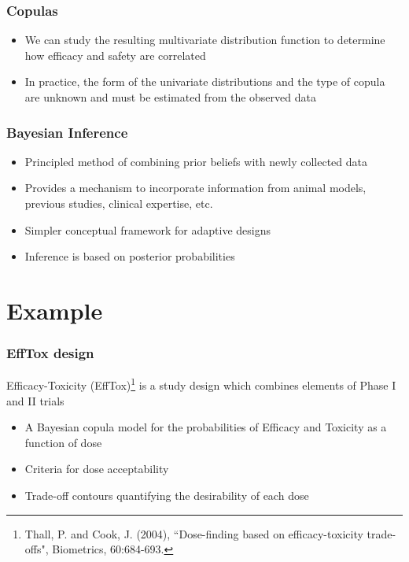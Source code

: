 \documentclass{beamer}
\begin{document}
	\begin{frame}
		\frametitle{Copulas}
		\begin{itemize}
		\setlength\itemsep{2em}
		\item We can study the resulting multivariate distribution function to determine how efficacy and safety are correlated
		\item In practice, the form of the univariate distributions and the type of copula are unknown and must be estimated from the observed data
		\end{itemize}
	\end{frame}
		
	\begin{frame}
		\frametitle{Bayesian Inference}
		\begin{itemize}
			\setlength\itemsep{2em}
			\item Principled method of combining prior beliefs with newly collected data 
			\item Provides a mechanism to incorporate information from animal models, previous studies, clinical expertise, etc.
			\item Simpler conceptual framework for adaptive designs
			\item Inference is based on posterior probabilities
		\end{itemize}
	\end{frame}	

	
\section{Example}
	
	\begin{frame}
		\frametitle{EffTox design}
		Efficacy-Toxicity (EffTox)\footnote{Thall, P. and Cook, J. (2004), ``Dose-finding based on efficacy-toxicity trade-offs", Biometrics, 60:684-693.} is a study design which combines elements of Phase I and II trials
		\begin{itemize}
			\setlength\itemsep{1.5em}
		\item A Bayesian copula model for the probabilities of Efficacy and Toxicity as a function of dose
		\item Criteria for dose acceptability
        \item Trade-off contours quantifying the desirability of each dose
		\end{itemize}
	\end{frame}
	
\end{document}
